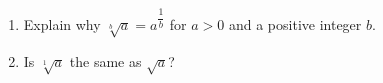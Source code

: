 \begin{enumerate}
\item[(a)] Explain why $\sqrt[b]a=a^{\dfrac1b}$ for $a>0$ and a positive integer $b$.
\item[(b)] Is $\sqrt[1]a$ the same as $\sqrt a$?
\end{enumerate}

